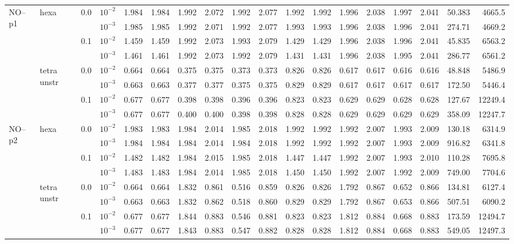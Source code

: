 \begin{longtable}{llclrrrrrrrrrrrrrr}
\multirow{8}{*}{NO--p1} & \multirow{4}{*}{hexa} & \multirow{2}{*}{0.0} & $10^{-2}$ & 1.984 & 1.984 & 1.992 & 2.072 & 1.992 & 2.077 & 1.992 & 1.992 & 1.996 & 2.038 & 1.997 & 2.041 & 50.383 & 4665.5 \\
& & & $10^{-3}$ & 1.985 & 1.985 & 1.992 & 2.071 & 1.992 & 2.077 & 1.993 & 1.993 & 1.996 & 2.038 & 1.996 & 2.041 & 274.71 & 4669.2 \\\cline{3-18}
& & \multirow{2}{*}{0.1} & $10^{-2}$ & 1.459 & 1.459 & 1.992 & 2.073 & 1.993 & 2.079 & 1.429 & 1.429 & 1.996 & 2.038 & 1.996 & 2.041 & 45.835 & 6563.2 \\
& & & $10^{-3}$ & 1.461 & 1.461 & 1.992 & 2.073 & 1.992 & 2.079 & 1.431 & 1.431 & 1.996 & 2.038 & 1.995 & 2.041 & 286.77 & 6561.2 \\\cline{2-18}
& \multirow{4}{*}{tetra unstr} & \multirow{2}{*}{0.0} & $10^{-2}$ & 0.664 & 0.664 & 0.375 & 0.375 & 0.373 & 0.373 & 0.826 & 0.826 & 0.617 & 0.617 & 0.616 & 0.616 & 48.848 & 5486.9 \\
& & & $10^{-3}$ & 0.663 & 0.663 & 0.377 & 0.377 & 0.375 & 0.375 & 0.829 & 0.829 & 0.617 & 0.617 & 0.617 & 0.617 & 172.50 & 5446.4 \\\cline{3-18}
& & \multirow{2}{*}{0.1} & $10^{-2}$ & 0.677 & 0.677 & 0.398 & 0.398 & 0.396 & 0.396 & 0.823 & 0.823 & 0.629 & 0.629 & 0.628 & 0.628 & 127.67 & 12249.4 \\
& & & $10^{-3}$ & 0.677 & 0.677 & 0.400 & 0.400 & 0.398 & 0.398 & 0.828 & 0.828 & 0.629 & 0.629 & 0.629 & 0.629 & 358.09 & 12247.7 \\\hline

\multirow{8}{*}{NO--p2} & \multirow{4}{*}{hexa} & \multirow{2}{*}{0.0} & $10^{-2}$ & 1.983 & 1.983 & 1.984 & 2.014 & 1.985 & 2.018 & 1.992 & 1.992 & 1.992 & 2.007 & 1.993 & 2.009 & 130.18 & 6314.9 \\
& & & $10^{-3}$ & 1.984 & 1.984 & 1.984 & 2.014 & 1.984 & 2.018 & 1.992 & 1.992 & 1.992 & 2.007 & 1.993 & 2.009 & 916.82 & 6341.8 \\\cline{3-18}
& & \multirow{2}{*}{0.1} & $10^{-2}$ & 1.482 & 1.482 & 1.984 & 2.015 & 1.985 & 2.018 & 1.447 & 1.447 & 1.992 & 2.007 & 1.993 & 2.010 & 110.28 & 7695.8 \\
& & & $10^{-3}$ & 1.483 & 1.483 & 1.984 & 2.014 & 1.985 & 2.018 & 1.450 & 1.450 & 1.992 & 2.007 & 1.992 & 2.009 & 749.00 & 7704.6 \\\cline{2-18}
& \multirow{4}{*}{tetra unstr} & \multirow{2}{*}{0.0} & $10^{-2}$ & 0.664 & 0.664 & 1.832 & 0.861 & 0.516 & 0.859 & 0.826 & 0.826 & 1.792 & 0.867 & 0.652 & 0.866 & 134.81 & 6127.4 \\
& & & $10^{-3}$ & 0.663 & 0.663 & 1.832 & 0.862 & 0.518 & 0.860 & 0.829 & 0.829 & 1.792 & 0.867 & 0.653 & 0.866 & 507.51 & 6090.2 \\\cline{3-18}
& & \multirow{2}{*}{0.1} & $10^{-2}$ & 0.677 & 0.677 & 1.844 & 0.883 & 0.546 & 0.881 & 0.823 & 0.823 & 1.812 & 0.884 & 0.668 & 0.883 & 173.59 & 12494.7 \\
& & & $10^{-3}$ & 0.677 & 0.677 & 1.843 & 0.883 & 0.547 & 0.882 & 0.828 & 0.828 & 1.812 & 0.884 & 0.668 & 0.883 & 549.05 & 12497.3 \\\hline


\end{longtable}

